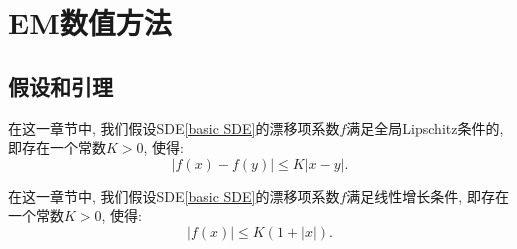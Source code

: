 

\chapter{EM数值方法}

\section{假设和引理}
\begin{assumption}\label{Lipschitz}
	在这一章节中, 我们假设SDE\cref{basic SDE}的漂移项系数$f$满足全局\textnormal{Lipschitz}条件的, 即存在一个常数$K>0$, 使得:
	\begin{equation}
		|f(x)-f(y)| \le K|x-y|. 
	\end{equation}
\end{assumption}

\begin{assumption}\label{linear growth}
	在这一章节中, 我们假设SDE\cref{basic SDE}的漂移项系数$f$满足线性增长条件, 即存在一个常数$K>0$, 使得:
	\begin{equation}
		|f(x)| \le K(1+|x|). 
	\end{equation}
\end{assumption}

